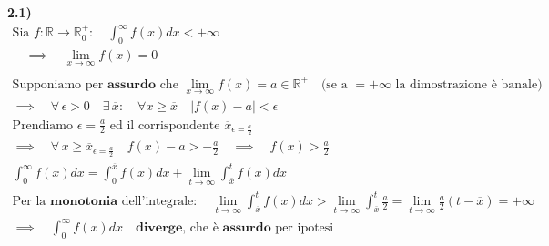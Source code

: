 \documentclass[11pt,reqno]{amsart}
\begin{document}
{\bf 2.1)}
\begin{gather*}
 \text{Sia } f:\mathbb{R}\to\mathbb{R}_0^{+}: \quad \int_{0}^{\infty} f(x) dx < +\infty\\
 \quad \implies \quad \lim_{x \to \infty} f(x) = 0\\\\
 \text{Supponiamo per } \textbf{assurdo} \text{ che } \lim_{x \to \infty} f(x) = a \in \mathbb{R}^{+} \quad \text{(se a } = +\infty \text{ la dimostrazione è banale)}\\
 \implies \quad \forall \, \epsilon > 0 \quad \exists \, \overline{x}: \quad \forall x \geq \overline{x} \quad |f(x) - a| < \epsilon\\
 \text{Prendiamo } \epsilon = \frac{a}{2} \text{ ed il corrispondente } \overline{x}_{\epsilon = \frac{a}{2}}\\
 \implies \quad \forall \, x \geq \overline{x}_{\epsilon = \frac{a}{2}} \quad f(x) - a > -\frac{a}{2} \quad \implies \quad f(x) > \frac{a}{2}\\
 \int_{0}^{\infty} f(x) dx = \int_{0}^{\overline{x}} f(x) dx + \lim_{t \to \infty} \int_{\overline{x}}^{t} f(x) dx\\
 \text{Per la } \textbf{monotonia} \text{ dell'integrale}: \quad \lim_{t \to \infty} \int_{\overline{x}}^{t} f(x) dx > \lim_{t \to \infty} \int_{\overline{x}}^{t} \frac{a}{2} = \lim_{t \to \infty} \frac{a}{2} (t-\overline{x}) = +\infty\\
 \implies \quad \int_{0}^{\infty} f(x) dx \quad \textbf{diverge} \text{, che è } \textbf{assurdo} \text{ per ipotesi}\\
\end{gather*}
\end{document}
